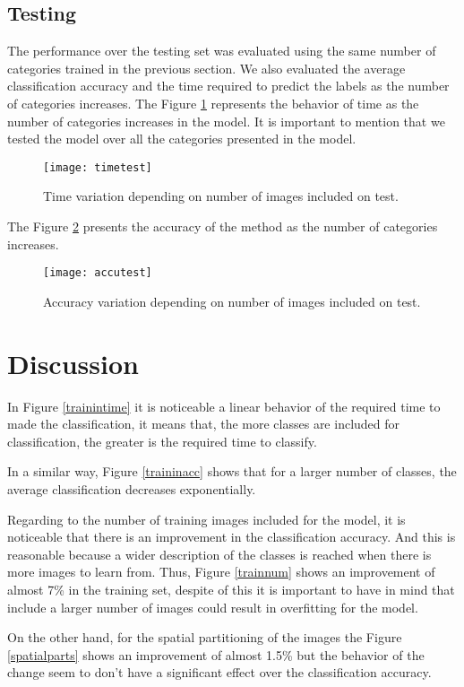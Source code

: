 \documentclass[10pt,twocolumn,letterpaper]{article}
\begin{document}
\subsection{Testing}
The performance over the testing set was evaluated using the same number of categories trained in the previous section. We also evaluated the average classification accuracy and the time required to predict the labels as the number of categories increases.
The  Figure \ref{testtime} represents the behavior of time as the number of categories increases in the model. It is important to mention that we tested the model over all the categories presented in the model.
\begin{figure}[h]
\centering
\texttt{[image: timetest]}
\caption{Time variation depending on number of images included on test.}
\label{testtime}
\centering
\end{figure}
The Figure \ref{testaccu} presents the accuracy of the method as the number of categories increases.
\begin{figure}[h]
\centering
\texttt{[image: accutest]}
\caption{Accuracy variation depending on number of images included on test.}
\label{testaccu}
\centering
\end{figure}
\section{Discussion}
In Figure \ref{trainintime} it is noticeable a linear behavior of the required time to made the classification, it means that, the more classes are included for classification, the greater is the required time to classify.

In a similar way, Figure \ref{traininacc} shows that for a larger number of classes, the average classification decreases exponentially.

Regarding to the number of training images included for the model, it is noticeable that there is an improvement in the classification accuracy. And this is reasonable because a wider description of the classes is reached when there is more images to learn from. Thus, Figure \ref{trainnum} shows an improvement of almost 7\% in the training set, despite of this it is important to have in mind that include a larger number of images could result in overfitting for the model.

On the other hand, for the spatial partitioning of the images the Figure \ref{spatialparts} shows an improvement of almost 1.5\% but the behavior of the change seem to don't have a significant effect over the classification accuracy.
\end{document}
